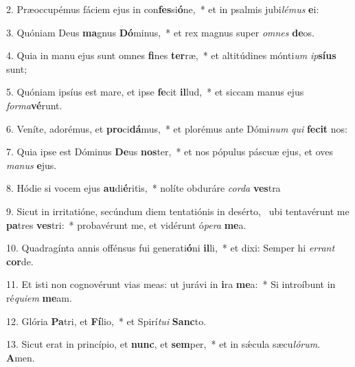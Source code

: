 2. Præoccupémus fáciem ejus in con\textbf{fes}si\textbf{ó}ne,~*  et in psalmis jubi\textit{lé}\textit{mus} \textbf{e}i:\

3. Quóniam Deus \textbf{ma}gnus \textbf{Dó}minus,~*  et rex magnus super \textit{om}\textit{nes} \textbf{de}os.\

4. Quia in manu ejus sunt omnes \textbf{fi}nes \textbf{ter}ræ,~*  et altitúdines mónti\textit{um} \textit{ip}\textbf{sí}\textbf{us} sunt;\

5. Quóniam ipsíus est mare, et ipse \textbf{fe}cit \textbf{il}lud,~*  et siccam manus ejus \textit{for}\textit{ma}\textbf{vé}runt.\

6. Veníte, adorémus, et \textbf{pro}ci\textbf{dá}mus,~*  et plorémus ante Dómi\textit{num} \textit{qui} \textbf{fe}\textbf{cit} nos:\

7. Quia ipse est Dóminus \textbf{De}us \textbf{nos}ter,~*  et nos pópulus páscuæ ejus, et oves \textit{ma}\textit{nus} \textbf{e}jus.\

8. Hódie si vocem ejus \textbf{au}di\textbf{é}ritis,~*  nolíte obduráre \textit{cor}\textit{da} \textbf{ves}tra\

9. Sicut in irritatióne, secúndum diem tentatiónis in desérto, \dag\  ubi tentavérunt me \textbf{pa}tres \textbf{ves}tri:~*  probavérunt me, et vidérunt ó\textit{pe}\textit{ra} \textbf{me}a.\

10. Quadragínta annis offénsus fui generati\textbf{ó}ni \textbf{il}li,~*  et dixi: Semper hi \textit{er}\textit{rant} \textbf{cor}de.\

11. Et isti non cognovérunt vias meas: ut jurávi in \textbf{i}ra \textbf{me}a:~*  Si introíbunt in ré\textit{qui}\textit{em} \textbf{me}am.\

12. Glória \textbf{Pa}tri, et \textbf{Fí}lio,~*  et Spirí\textit{tu}\textit{i} \textbf{Sanc}to.\

13. Sicut erat in princípio, et \textbf{nunc}, et \textbf{sem}per,~*  et in sǽcula sæcu\textit{ló}\textit{rum}. \textbf{A}men.\

